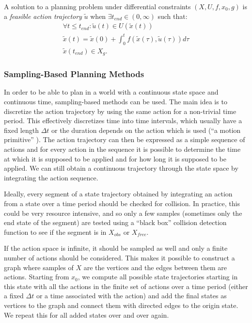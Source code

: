 \begin{defn}
	A solution to a planning problem under differential constraints $\left(X, U, f, x_0, g\right)$ is a \textit{feasible action trajectory} $\tilde{u}$ when $\exists t_{end} \in \left(0, \infty\right)$ such that:
	\begin{gather*}
	\forall t \leq t_{end}: \tilde{u}(t)\in U(\tilde{x}(t)) \\
	\tilde{x}(t) = \tilde{x}(0) + \int_0^t f(\tilde{x}(\tau), \tilde{u}(\tau)) d\tau \\
	\tilde{x}(t_{end})\in X_g.
	\end{gather*}
\end{defn}

\subsubsection{Sampling-Based Planning Methods}

In order to be able to plan in a world with a continuous state space and continuous time, sampling-based methods can be used. The main idea is to discretize the action trajectory by using the same action for a non-trivial time period. This effectively discretizes time into time intervals, which usually have a fixed length $\Delta t$ or the duration depends on the action which is used (``a motion primitive'' \cite[Section~14.2.3]{lavalle_2006}). The action trajectory can then be expressed as a simple sequence of actions and for every action in the sequence it is possible to determine the time at which it is supposed to be applied and for how long it is supposed to be applied. We can still obtain a continuous trajectory through the state space by integrating the action sequence.

Ideally, every segment of a state trajectory obtained by integrating an action from a state over a time period should be checked for collision. In practice, this could be very resource intensive, and so only a few samples (sometimes only the end state of the segment) are tested using a ``black box'' collision detection function to see if the segment is in $X_{obs}$ or $X_{free}$.

If the action space is infinite, it should be sampled as well and only a finite number of actions should be considered. This makes it possible to construct a graph where samples of $X$ are the vertices and the edges between them are actions. Starting from $x_0$, we compute all possible state trajectories starting in this state with all the actions in the finite set of actions over a time period (either a fixed $\Delta t$ or a time associated with the action) and add the final states as vertices to the graph and connect them with directed edges to the origin state. We repeat this for all added states over and over again.

